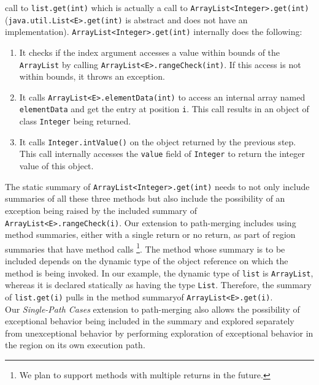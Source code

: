 call to {\tt list.get(int)} which is actually a call to {\tt ArrayList<Integer>.get(int)} ({\tt java.util.List<E>.get(int)} is abstract and does not have an implementation).
%
{\tt ArrayList<Integer>.get(int)} internally does the following:
%
\begin{enumerate}
\item It checks if the index argument accesses a value within bounds of the {\tt ArrayList} by calling {\tt ArrayList<E>.rangeCheck(int)}. If this access is not within bounds, it throws an exception.
%
\item It calls {\tt ArrayList<E>.elementData(int)} to access an internal array named {\tt elementData} and get the entry at position {\tt i}. This call results in an object of class {\tt Integer} being returned.
%
\item It calls {\tt Integer.intValue()} on the object returned by the previous step. This call internally accesses the {\tt value} field of {\tt Integer} to return the integer value of this object.
%
\end{enumerate}

The static summary of {\tt ArrayList<Integer>.get(int)} needs to not only include summaries of all these three methods but
also include the possibility of an exception being raised by the included summary of {\tt ArrayList<E>.rangeCheck(i)}.
%
Our extension to path-merging includes using method summaries, either with a single return or no return, as part of region summaries that have method calls \footnote{We plan to support methods with multiple returns in the future.}.
%
The method whose summary is to be included depends on the dynamic type of the object reference on which the method is being invoked.
%
In our example, the dynamic type of {\tt list} is {\tt ArrayList}, whereas it is declared statically as having the type {\tt List}.
%
Therefore, the summary of {\tt list.get(i)} pulls in the method summaryof {\tt ArrayList<E>.get(i)}.\\
%
Our \textit{Single-Path Cases} extension to path-merging also allows the possibility of exceptional behavior being
included in the summary and explored separately from unexceptional behavior by performing exploration of exceptional
behavior in the region on its own execution path.
%
